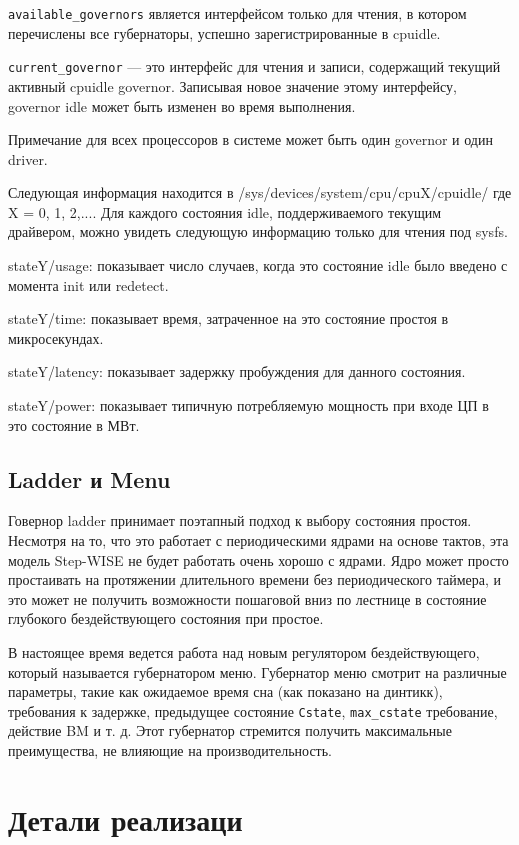 \documentclass{article}
\begin{document}
\texttt{available\_governors} является интерфейсом только для чтения, в котором перечислены все губернаторы, успешно зарегистрированные в cpuidle.

\texttt{current\_governor} — это интерфейс для чтения и записи, содержащий текущий активный cpuidle governor. Записывая новое значение этому интерфейсу, governor idle может быть изменен во время выполнения.

Примечание для всех процессоров в системе может быть один governor и один driver.

Следующая информация находится в /sys/devices/system/cpu/cpuX/cpuidle/ где X = 0, 1, 2,.... Для каждого состояния idle, поддерживаемого текущим драйвером, можно увидеть следующую информацию только для чтения под sysfs.

stateY/usage: показывает число случаев, когда это состояние idle было введено с момента init или redetect.

stateY/time: показывает время, затраченное на это состояние простоя в микросекундах. 

stateY/latency: показывает задержку пробуждения для данного состояния.

stateY/power: показывает типичную потребляемую мощность при входе ЦП в это состояние в МВт.

\subsection{Ladder и Menu}

Говернор ladder принимает поэтапный подход к выбору состояния простоя. Несмотря на то, что это работает с периодическими ядрами на основе тактов, эта модель Step-WISE не будет работать очень хорошо с ядрами. Ядро может просто простаивать на протяжении длительного времени без периодического таймера, и это может не получить возможности пошаговой вниз по лестнице в состояние глубокого бездействующего состояния при простое.

В настоящее время ведется работа над новым регулятором бездействующего, который называется губернатором меню. Губернатор меню смотрит на различные параметры, такие как ожидаемое время сна (как показано на динтикк), требования к задержке, предыдущее состояние \texttt{C\-state}, \texttt{max\_cstate} требование, действие BM и т. д. Этот губернатор стремится получить максимальные преимущества, не влияющие на производительность.

\newpage
\section{Детали реализаци}
\end{document}
